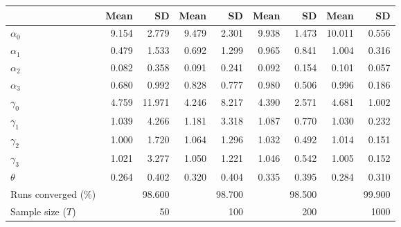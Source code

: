 
\begin{tabular}[t]{lrrrrrrrr}
\toprule
  & Mean & SD & Mean  & SD  & Mean   & SD   & Mean    & SD   \\
\midrule
$\alpha_{0}$ & 9.154 & 2.779 & 9.479 & 2.301 & 9.938 & 1.473 & 10.011 & 0.556\\
$\alpha_{1}$ & 0.479 & 1.533 & 0.692 & 1.299 & 0.965 & 0.841 & 1.004 & 0.316\\
$\alpha_{2}$ & 0.082 & 0.358 & 0.091 & 0.241 & 0.092 & 0.154 & 0.101 & 0.057\\
$\alpha_{3}$ & 0.680 & 0.992 & 0.828 & 0.777 & 0.980 & 0.506 & 0.996 & 0.186\\
$\gamma_{0}$ & 4.759 & 11.971 & 4.246 & 8.217 & 4.390 & 2.571 & 4.681 & 1.002\\
$\gamma_{1}$ & 1.039 & 4.266 & 1.181 & 3.318 & 1.087 & 0.770 & 1.030 & 0.232\\
$\gamma_{2}$ & 1.000 & 1.720 & 1.064 & 1.296 & 1.032 & 0.492 & 1.014 & 0.151\\
$\gamma_{3}$ & 1.021 & 3.277 & 1.050 & 1.221 & 1.046 & 0.542 & 1.005 & 0.152\\
$\theta$ & 0.264 & 0.402 & 0.320 & 0.404 & 0.335 & 0.395 & 0.284 & 0.310\\
Runs converged (\%) &  & 98.600 &  & 98.700 &  & 98.500 &  & 99.900\\
Sample size ($T$) &  & 50 &  & 100 &  & 200 &  & 1000\\
\bottomrule
\end{tabular}
